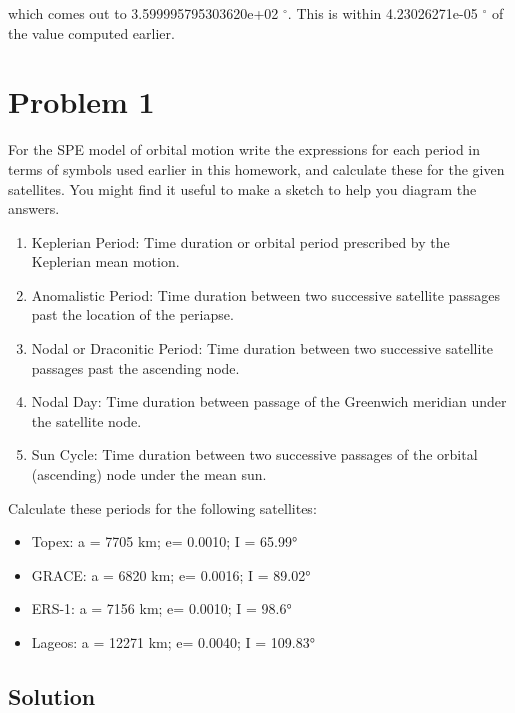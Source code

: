 \documentclass[conf]{new-aiaa}
\begin{document}
which comes out to 3.599995795303620e+02 $^\circ$. This is within 4.23026271e-05 $^\circ$ of the value computed earlier. 



\newpage 
\section*{Problem 1}

For the SPE model of orbital motion write the expressions for each period in terms of symbols used earlier in this homework, and calculate these for the given satellites. You might find it useful to make a sketch to help you diagram the answers. \newline 

\begin{enumerate}[label=(\alph*)]
	\item Keplerian Period: Time duration or orbital period prescribed by the Keplerian mean motion. 
	\item Anomalistic Period: Time duration between two successive satellite passages past the location of the periapse.
	\item Nodal or Draconitic Period: Time duration between two successive satellite passages past the ascending node.
	\item Nodal Day: Time duration between passage of the Greenwich meridian under the satellite node.
	\item Sun Cycle: Time duration between two successive passages of the orbital (ascending) node under the mean sun. \newline 
\end{enumerate} 

Calculate these periods for the following satellites:  

\begin{itemize}
	\item Topex: a = 7705 km; e= 0.0010; I = 65.99°
	\item GRACE: a = 6820 km; e= 0.0016; I = 89.02°
	\item ERS-1: a = 7156 km; e= 0.0010; I = 98.6°
	\item Lageos: a = 12271 km; e= 0.0040; I = 109.83° 
\end{itemize}

\subsection{Solution}
\end{document}
